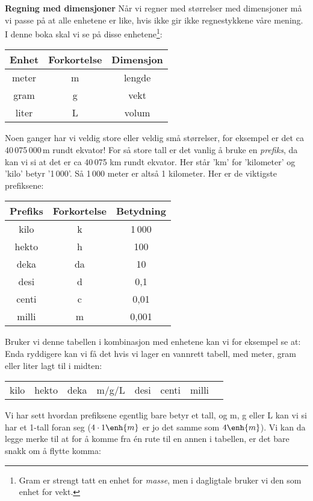 \textbf{Regning med dimensjoner}\os
Når vi regner med størrelser med dimensjoner må vi passe på at alle enhetene er like, hvis ikke gir ikke regnestykkene våre mening. I denne boka skal vi se på disse enhetene\footnote{Gram er strengt tatt en enhet for \textit{masse}, men i dagligtale bruker vi den som enhet for vekt.}:
\tbs
\begin{center}
	\begin{tabular}{c|c|c}
		\textbf{Enhet} & \textbf{Forkortelse}&\textbf{Dimensjon} \\ \hline
		meter & m&lengde \\\hline
		gram & g&vekt \\\hline
		liter & L &volum
	\end{tabular}
\end{center}\tbs
Noen ganger har vi veldig store eller veldig små størrelser, for eksempel er det ca 40\,075\,000\,m rundt ekvator! For så store tall er det vanlig å bruke en \textit{prefiks}, da kan vi si at det er ca 40\,075 km rundt ekvator. Her står 'km' for 'kilometer' og 'kilo' betyr '1\,000'. Så 1\,000 meter er altså 1 kilometer. Her er de viktigste prefiksene:\tbs
\begin{center}
	\begin{tabular}{c|c|c}
		\textbf{Prefiks} & \textbf{Forkortelse}&\textbf{Betydning} \\ \hline
		kilo & k & 1\,000\\\hline
		hekto & h & 100\\\hline
		deka & da & 10\\\hline
		desi & d & 0,1\\\hline
		centi & c & 0,01\\\hline
		milli & m & 0,001\\\hline		
	\end{tabular}
\end{center}\tbs
Bruker vi denne tabellen i kombinasjon med enhetene kan vi for eksempel se at:\vs
{}
Enda ryddigere kan vi få det hvis vi lager en vannrett tabell, med meter, gram eller liter lagt til i midten:
\begin{center}
	\begin{tabular}{|c|c|c|c|c|c|c|c}
		kilo &
		hekto &
		deka & m/g/L &
		desi & 
		centi & 
		milli & 		
	\end{tabular}
\end{center}
Vi har sett hvordan prefiksene egentlig bare betyr et tall, og m, g eller L kan vi si har et 1-tall foran seg ($ {4\cdot1\enh{m}} $ er jo det samme som $ 4\enh{m} $). Vi kan da legge merke til at for å komme fra én rute til en annen i tabellen, er det bare snakk om å flytte komma:
